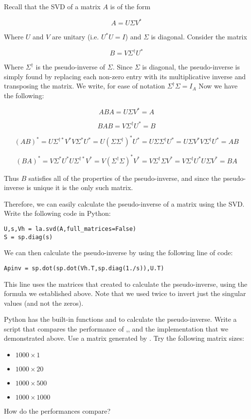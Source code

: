 Recall that the SVD of a matrix $A$ is of the form

\[
A = U \Sigma V^*
\]

Where $U$ and $V$ are unitary (i.e. $U^*U = I$) and $\Sigma$ is diagonal. Consider the matrix

\[
B = V \Sigma^\dagger U^*
\]

Where $\Sigma^\dagger$ is the pseudo-inverse of $\Sigma$. Since $\Sigma$ is diagonal, the pseudo-inverse is simply found by replacing each non-zero entry with its multiplicative inverse and transposing the matrix. We write, for ease of notation $\Sigma^\dagger \Sigma = I_A$ Now we have the following:

\[
ABA = U \Sigma V^* = A
\]

\[
BAB = V \Sigma^\dagger U^* = B
\]

\[
(AB)^* = U \Sigma^{\dagger *} V^* V \Sigma^* U^* = U (\Sigma \Sigma^\dagger)^* U^* = U \Sigma \Sigma^\dagger U^* = U \Sigma V^* V \Sigma^\dagger U^* = AB
\]

\[
(BA)^* =  V \Sigma^* U^* U \Sigma^{\dagger *} V^* = V (\Sigma^\dagger \Sigma)^* V^* = V  \Sigma^\dagger \Sigma V^* =  V \Sigma^\dagger U^* U \Sigma V^* = BA
\]

Thus $B$ satisfies all of the properties of the pseudo-inverse, and since the pseudo-inverse is unique it is the only such matrix.

Therefore, we can easily calculate the pseudo-inverse of a matrix using the SVD. Write the following code in Python:

\begin{lstlisting}
U,s,Vh = la.svd(A,full_matrices=False)
S = sp.diag(s)
\end{lstlisting}
We can then calculate the pseudo-inverse by using the following line of code:

\begin{lstlisting}
Apinv = sp.dot(sp.dot(Vh.T,sp.diag(1./s)),U.T)
\end{lstlisting}

This line uses the matrices that  created to calculate the pseudo-inverse, using the formula we established above. Note that we used  twice to invert just the singular values (and not the zeros). 
\begin{problem}
Python has the built-in functions  and  to calculate the pseudo-inverse. Write a script that compares the performance of ,, and the implementation that we demonstrated above. Use a matrix generated by  .
 Try the following matrix sizes:
\begin{itemize}
\item $1000 \times 1$
\item $1000 \times 20$
\item $1000 \times 500$
\item $1000 \times 1000$
\end{itemize}
How do the performances compare?
\end{problem}

